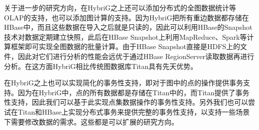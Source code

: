 关于进一步的研究方向，在HybriG之上还可以添加分布式的全图数据统计等OLAP的支持，也可以添加图计算的支持。因为HybriG把所有重边数据都存储在HBase中，而且这些数据在导入之后就是只读的，因此可以利用HBase的Snapshot技术对数据定期建立快照，此后在HBase Snapshot上利用MapReduce、Spark等计算框架即可实现全图数据的批量计算。由于HBase Snapshot直接是HDFS上的文件，因此对它们进行分析的性能会远优于通过HBase RegionServer读取数据再进行分析。在这方面HybriG相比传统图数据库Titan具有先天优势。

在HybriG之上也可以实现简化的事务性支持，即对于图中的点的操作提供事务支持。因为在HybriG中，点的所有数据都是存储在Titan中的，而Titan提供了事务性支持，因此我们可以基于此实现点集数据操作的事务性支持。另外我们也可以尝试在Titan和HBase上实现分布式事务来提供完整的事务性支持，以支持一些场景下需要修改数据的需求。这些都是可以扩展的研究方向。

